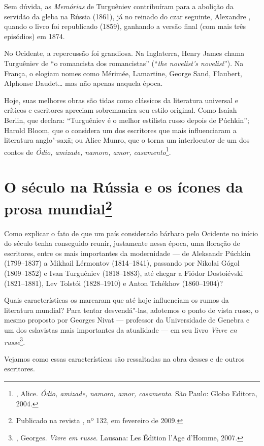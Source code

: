Sem dúvida, as \emph{Memórias} de Turguêniev contribuíram para a abolição da servidão da gleba na Rússia (1861), já no reinado do czar seguinte, Alexandre , quando o livro foi republicado (1859), ganhando a versão final (com mais três episódios) em 1874.

No Ocidente, a repercussão foi grandiosa. Na Inglaterra, Henry James chama Turguêniev de ``o romancista dos romancistas'' (``\emph{the novelist's novelist}''). Na França, o elogiam nomes como Mérimée, Lamartine, George Sand, Flaubert, Alphonse Daudet\ldots{} mas não apenas naquela época.

Hoje, suas melhores obras são tidas como clássicos da literatura universal e críticos e escritores apreciam sobremaneira seu estilo original. Como Isaiah Berlin, que declara: ``Turguêniev é o melhor estilista russo depois de Púchkin''; Harold Bloom, que o considera um dos escritores que mais influenciaram a literatura anglo"-saxã; ou Alice Munro, que o torna um interlocutor de um dos contos de \emph{Ódio, amizade, namoro, amor, casamento}\footnote{, Alice. \emph{Ódio, amizade, namoro, amor, casamento}. São Paulo: Globo Editora, 2004.}.

\chapter{O século  na Rússia e os ícones da prosa mundial\footnote{Publicado na revista , nº 132, em fevereiro de 2009.}}

Como explicar o fato de que um país considerado bárbaro pelo Ocidente no
início do século  tenha conseguido reunir, justamente nessa época,
uma floração de escritores, entre os mais importantes da modernidade ---
de Aleksandr Púchkin (1799--1837) a Mikhail Lérmontov (1814--1841),
passando por Nikolai Gógol (1809--1852) e Ivan Turguêniev (1818--1883),
até chegar a Fiódor Dostoiévski (1821--1881), Lev Tolstói (1828--1910) e
Anton Tchékhov (1860--1904)?

Quais características os marcaram que até hoje influenciam os rumos da literatura mundial? Para tentar desvendá"-las, adotemos o ponto de vista russo, o mesmo proposto por Georges Nivat --- professor da Universidade de Genebra e um dos eslavistas mais importantes da atualidade --- em seu livro \emph{Vivre en russe}\footnote{, Georges. \emph{Vivre em russe}. Lausana: Les Édition l'Age d'Homme, 2007.}.

Vejamos como essas características são ressaltadas na obra desses e de
outros escritores.

